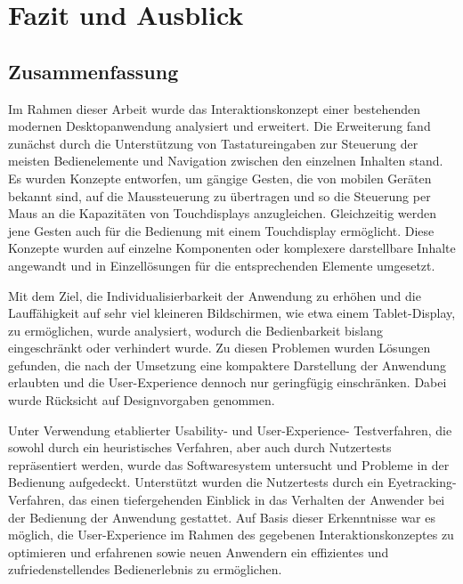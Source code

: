 \chapter{Fazit und Ausblick}
\section{Zusammenfassung}
Im Rahmen dieser Arbeit wurde das Interaktionskonzept einer bestehenden modernen Desktopanwendung analysiert und erweitert. Die Erweiterung fand zunächst durch die Unterstützung von Tastatureingaben zur Steuerung der meisten Bedienelemente und Navigation zwischen den einzelnen Inhalten stand. Es wurden Konzepte entworfen, um gängige Gesten, die von mobilen Geräten bekannt sind, auf die Maussteuerung zu übertragen und so die Steuerung per Maus an die Kapazitäten von Touchdisplays anzugleichen. Gleichzeitig werden jene Gesten auch für die Bedienung mit einem Touchdisplay ermöglicht. Diese Konzepte wurden auf einzelne Komponenten oder komplexere darstellbare Inhalte angewandt und in Einzellösungen für die entsprechenden Elemente umgesetzt.\par
Mit dem Ziel, die Individualisierbarkeit der Anwendung zu erhöhen und die Lauffähigkeit auf sehr viel kleineren Bildschirmen, wie etwa einem Tablet-Display, zu ermöglichen, wurde analysiert, wodurch die Bedienbarkeit bislang eingeschränkt oder verhindert wurde. Zu diesen Problemen wurden Lösungen gefunden, die nach der Umsetzung eine kompaktere Darstellung der Anwendung erlaubten und die User-Experience dennoch nur geringfügig einschränken. Dabei wurde Rücksicht auf Designvorgaben genommen.\par
Unter Verwendung etablierter Usability- und User-Experience- Testverfahren, die sowohl durch ein heuristisches Verfahren, aber auch durch Nutzertests repräsentiert werden, wurde das Softwaresystem untersucht und Probleme in der Bedienung aufgedeckt. Unterstützt wurden die Nutzertests durch ein Eyetracking-Verfahren, das einen tiefergehenden Einblick in das Verhalten der Anwender bei der Bedienung der Anwendung gestattet. Auf Basis dieser Erkenntnisse war es möglich, die User-Experience im Rahmen des gegebenen Interaktionskonzeptes zu optimieren und erfahrenen sowie neuen Anwendern ein effizientes und zufriedenstellendes Bedienerlebnis zu ermöglichen.\par
